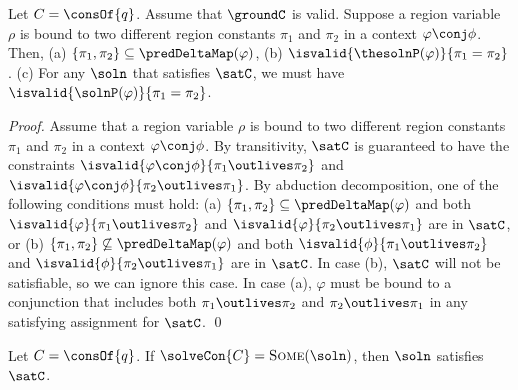 \begin{lemma}
  \label{lemma:two-bindings}
Let $C = \consOf{q}$. Assume that $\groundC$ is valid.
Suppose a region variable $\rho$ is bound to two different region constants $\pi_1$
and $\pi_2$ in a context $\varphi \conj \phi$. %
Then, 
(a) $\{ \pi_1, \pi_2 \} \subseteq \predDeltaMap(\varphi)$,
(b) $\isvalid{\thesolnP(\varphi)}{\pi_1 = \pi_2}$.
(c) For any $\soln$ that satisfies $\satC$, we must have $\isvalid{\solnP(\varphi)}{\pi_1 = \pi_2}$.
\end{lemma}

\begin{proof}
  Assume that a region variable $\rho$ is bound to two different
  region constants $\pi_1$ and $\pi_2$ in a context $\varphi \conj \phi$.
  By transitivity, $\satC$ is guaranteed to have the constraints
  $\isvalid{\varphi \conj \phi}{\pi_1 \outlives \pi_2}$
  and $\isvalid{\varphi \conj \phi}{\pi_2 \outlives \pi_1}$.
  By abduction decomposition, one of the following conditions must hold:
  (a) $\{ \pi_1, \pi_2 \} \subseteq \predDeltaMap(\varphi)$ and
  both $\isvalid{\varphi}{\pi_1 \outlives \pi_2}$ and
  $\isvalid{\varphi}{\pi_2 \outlives \pi_1}$ are in $\satC$, or
  (b) $\{ \pi_1, \pi_2 \} \not\subseteq \predDeltaMap(\varphi)$ and
  both $\isvalid{\phi}{\pi_1 \outlives \pi_2}$ and
  $\isvalid{\phi}{\pi_2 \outlives \pi_1}$ are in $\satC$.
  In case (b), $\satC$ will not be satisfiable, so we can ignore this case.
  In case (a), $\varphi$ must be bound to a conjunction that includes both
  $\pi_1 \outlives \pi_2$ and $\pi_2 \outlives \pi_1$ in any satisfying assignment
  for $\satC$.
\qed
\end{proof}

% 

\begin{theorem}
\label{thm:constraint-solver-soundness}
Let $C = \consOf{q}$.
If $\solveCon{C} = \textsc{Some}(\soln)$,
then $\soln$ satisfies $\satC$.
\end{theorem}

